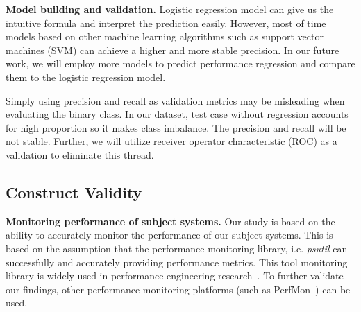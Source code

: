 \textbf{Model building and validation.} 
Logistic regression model can give us the intuitive formula and interpret the prediction easily. However, most of time models based on other machine learning algorithms such as support vector machines (SVM) can achieve a higher and more stable precision. In our future work, we will employ more models to predict performance regression and compare them to the logistic regression model.

Simply using precision and recall as validation metrics may be misleading when evaluating the binary class. In our dataset, test case without regression accounts for high proportion so it makes class imbalance. The precision and recall will be not stable.  Further, we will utilize receiver operator characteristic (ROC) as a validation to eliminate this thread.
\subsection{Construct Validity}

\textbf{Monitoring performance of subject systems.} Our study is based on the ability to accurately monitor the performance of our subject systems. This is based on the assumption that the performance monitoring library, i.e. \emph{psutil} can successfully and accurately providing performance metrics. This tool monitoring library is widely used in performance engineering research~\cite{peterfse,tarekmsr16}. To further validate our findings, other performance monitoring platforms (such as PerfMon~\cite{perfmon}) can be used. 



